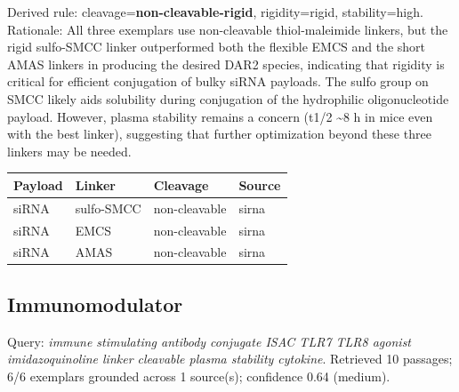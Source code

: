 \documentclass[10pt]{article}
\begin{document}
Derived rule: cleavage=\textbf{non-cleavable-rigid}, rigidity=rigid, stability=high. Rationale: All three exemplars use non-cleavable thiol-maleimide linkers, but the rigid sulfo-SMCC linker outperformed both the flexible EMCS and the short AMAS linkers in producing the desired DAR2 species, indicating that rigidity is critical for efficient conjugation of bulky siRNA payloads. The sulfo group on SMCC likely aids solubility during conjugation of the hydrophilic oligonucleotide payload. However, plasma stability remains a concern (t1/2 \textasciitilde{}8 h in mice even with the best linker), suggesting that further optimization beyond these three linkers may be needed.
\begin{table}[h]\centering\scriptsize\begin{tabular}{l l l l}\toprule Payload & Linker & Cleavage & Source \\ \midrule siRNA & sulfo-SMCC & non-cleavable & sirna \\
siRNA & EMCS & non-cleavable & sirna \\
siRNA & AMAS & non-cleavable & sirna \\ \bottomrule\end{tabular}\end{table}
\subsection{Immunomodulator}
Query: \emph{immune stimulating antibody conjugate ISAC TLR7 TLR8 agonist imidazoquinoline linker cleavable plasma stability cytokine}. Retrieved 10 passages; 6/6 exemplars grounded across 1 source(s); confidence 0.64 (medium).
\end{document}
